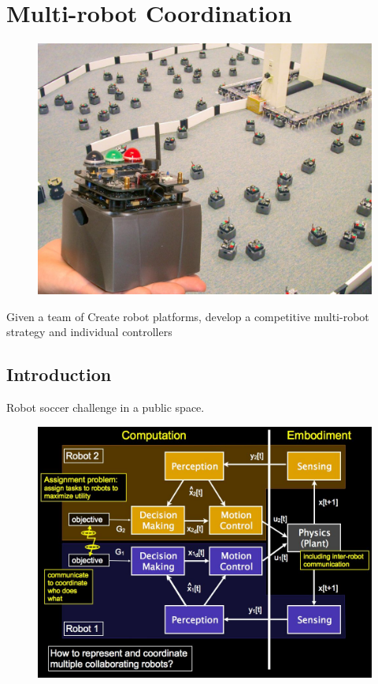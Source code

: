 

\chapter{Multi-robot Coordination}
\label{sec:multi_robot}

\begin{figure}[!h]
\centering
\includegraphics[width=1.0\columnwidth]{figures/10_teaser.jpg}
\end{figure}

\newpage

Given a team of Create robot platforms, develop a competitive multi-robot strategy and individual controllers

\section{Introduction}

Robot soccer challenge in a public space.

\begin{figure}[!h]
\centering
\includegraphics[width=0.8\columnwidth]{figures/10_control_loop.jpg}
\end{figure}

